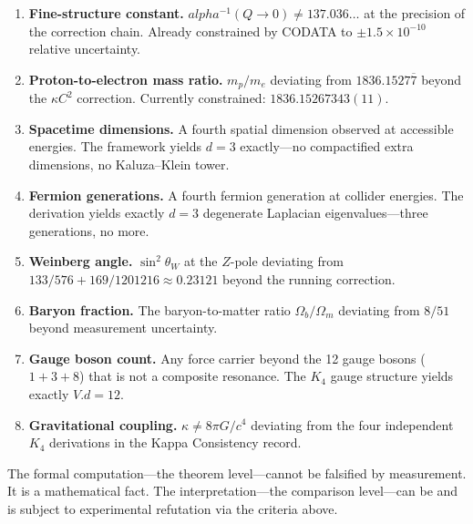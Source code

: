 \documentclass[11pt,a4paper]{book}
\def\alpha{alpha}%
\def\cdot{.}%
\begin{document}
\begin{enumerate}
\item \textbf{Fine-structure constant.} $\alpha^{-1}(Q \to 0) \ne 137.036\ldots$ at the precision of the correction chain. Already constrained by CODATA to $\pm 1.5 \times 10^{-10}$ relative uncertainty.
\item \textbf{Proton-to-electron mass ratio.} $m_p/m_e$ deviating from $1836.1527\overline{7}$ beyond the $\kappa C^2$ correction. Currently constrained: $1836.15267343(11)$.
\item \textbf{Spacetime dimensions.} A fourth spatial dimension observed at accessible energies. The framework yields $d = 3$ exactly---no compactified extra dimensions, no Kaluza--Klein tower.
\item \textbf{Fermion generations.} A fourth fermion generation at collider energies. The derivation yields exactly $d = 3$ degenerate Laplacian eigenvalues---three generations, no more.
\item \textbf{Weinberg angle.} $\sin^2\!\theta_W$ at the $Z$-pole deviating from $133/576 + 169/1201216 \approx 0.23121$ beyond the running correction.
\item \textbf{Baryon fraction.} The baryon-to-matter ratio $\Omega_b / \Omega_m$ deviating from $8/51$ beyond measurement uncertainty.
\item \textbf{Gauge boson count.} Any force carrier beyond the 12 gauge bosons ($1 + 3 + 8$) that is not a composite resonance. The $K_4$ gauge structure yields exactly $V \cdot d = 12$.
\item \textbf{Gravitational coupling.} $\kappa \ne 8\pi G / c^4$ deviating from the four independent $K_4$ derivations in the Kappa Consistency record.
\end{enumerate}

The formal computation---the theorem level---cannot be falsified by measurement. It is a mathematical fact. The interpretation---the comparison level---can be and is subject to experimental refutation via the criteria above.
\end{document}
